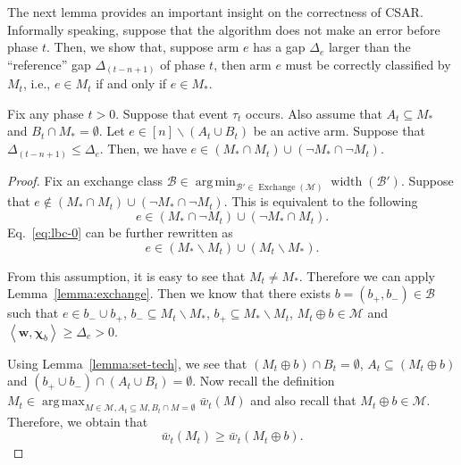\documentclass{article}
\newcommand{\AlgorithmBud}{{\small \textsf{CSAR}}\xspace}
\newcommand{\M}{\mathcal M}
\newcommand{\B}{\mathcal B}
\newcommand{\del}{\backslash}
\DeclareMathOperator{\rank}{width}
\DeclareMathOperator*{\argmax}{arg\,max}
\DeclareMathOperator*{\argmin}{arg\,min}
\DeclareMathOperator{\Exchange}{Exchange}
\newcommand{\inn}[1]{\left\langle #1 \right\rangle}
\renewcommand{\vec}[1]{\boldsymbol{#1}}
\begin{document}
The next lemma provides an important insight on the correctness of \AlgorithmBud.
Informally speaking, suppose that the algorithm does not make an error before phase $t$.
Then, we show that, suppose arm $e$ has a gap $\Delta_e$ larger than the ``reference'' gap $\Delta_{(t-n+1)}$ of phase $t$, then arm $e$ must be correctly classified by $M_t$, i.e., $e\in M_t$ if and only if $e\in M_*$.
\begin{lemma}
Fix any phase $t>0$. 
Suppose that event $\tau_t$ occurs. 
Also assume that $A_t \subseteq M_*$ and $B_t \cap M_* = \emptyset$.
Let $e\in [n] \del (A_t \cup B_t)$ be an active arm.
Suppose that $\Delta_{(t-n+1)} \le \Delta_e$.
Then, we have $e\in (M_* \cap M_t) \cup ( \neg M_* \cap \neg M_t)$.
\label{lemma:budget:correct}
\end{lemma}

\begin{proof}

Fix an exchange class $\B\in \argmin_{\B'\in \Exchange(\M)} \rank(\B')$.
Suppose that $e\not\in (M_* \cap M_t) \cup ( \neg M_* \cap \neg M_t)$. 
This is equivalent to the following 
\begin{equation}
\label{eq:lbc-0}
e\in (M_* \cap \neg M_t) \cup (\neg M_* \cap M_t).
\end{equation}
Eq.~\eqref{eq:lbc-0} can be further rewritten as 
$$
e\in (M_* \del M_t) \cup (M_t \del M_*).
$$

From this assumption, it is easy to see that $M_t \not= M_*$.
Therefore we can apply Lemma~\ref{lemma:exchange}.
Then we know that there exists $b=(b_+,b_-)\in \B$ such that 
$e\in b_- \cup b_+$, $b_-\subseteq M_t \del M_*$, $b_+\subseteq M_* \del M_t$, $M_t\oplus b \in \M$ and $\inn{\vec w, \vec \chi_b} \ge \Delta_e > 0$.

Using Lemma~\ref{lemma:set-tech}, we see that
$(M_t \oplus b) \cap B_t = \emptyset$, $A_t \subseteq (M_t \oplus b)$ and $(b_+\cup b_-) \cap (A_t \cup B_t) = \emptyset$.
Now recall the definition $M_t \in \argmax_{M\in \M, A_t\subseteq M, B_t \cap M = \emptyset} \bar w_t(M)$ and also recall that $M_t \oplus b \in \M$.
Therefore, we obtain that 
\begin{equation}
\label{eq:lbc-1}
\bar w_t(M_t) \ge \bar w_t(M_t \oplus b).
\end{equation}


\end{proof}
\end{document}
